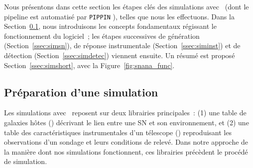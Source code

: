 \documentclass[../main/main.tex]{subfiles}
\begin{document}
Nous présentons dans cette section les étapes clés des simulations avec \snana\
(dont le pipeline est automatisé par \texttt{PIPPIN} \citep{hinton2020}), telles
que nous les effectuons. Dans la Section~\ref{ssec:simprep}, nous introduisons
les concepts fondamentaux régissant le fonctionnement du logiciel~; les étapes
successives de génération (Section~\ref{ssec:simsn}), de réponse instrumentale
(Section~\ref{ssec:siminst}) et de détection (Section~\ref{ssec:simdetec})
viennent ensuite. Un résumé est proposé Section~\ref{ssec:simshort}, avec la
Figure~\ref{fig:snana_func}.

\subsection{Préparation d'une simulation}\label{ssec:simprep}

Les simulations avec \snana\ reposent sur deux librairies principales~: (1) une
table de galaxies hôtes (\hostlib) décrivant le lien entre une SN et son
environnement, et (2) une table des caractéristiques instrumentales d'un
télescope (\simlib) reproduisant les observations d'un sondage et leurs
conditions de relevé. Dans notre approche de la manière dont nos simulations
fonctionnent, ces librairies précèdent le procédé de simulation.

\subsubsection{\hostlib}\label{sssec:hostlib}
\end{document}
